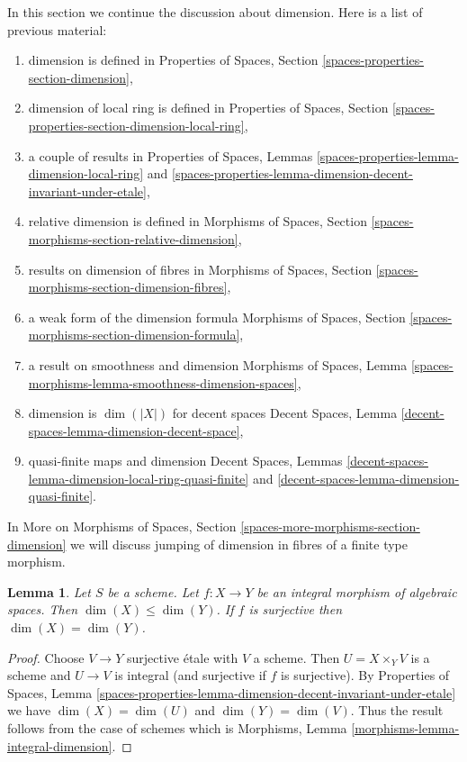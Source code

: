 \documentclass{stacks-project}
\theoremstyle{plain}
\newtheorem{lemma}[subsection]{Lemma}
\theoremstyle{definition}
\theoremstyle{remark}
\numberwithin{equation}{subsection}
\begin{document}
\noindent
In this section we continue the discussion about dimension.
Here is a list of previous material:
\begin{enumerate}
\item dimension is defined in
Properties of Spaces, Section
\ref{spaces-properties-section-dimension},
\item dimension of local ring is defined in
Properties of Spaces, Section
\ref{spaces-properties-section-dimension-local-ring},
\item a couple of results in Properties of Spaces, Lemmas
\ref{spaces-properties-lemma-dimension-local-ring} and
\ref{spaces-properties-lemma-dimension-decent-invariant-under-etale},
\item relative dimension is defined in
Morphisms of Spaces, Section \ref{spaces-morphisms-section-relative-dimension},
\item results on dimension of fibres in
Morphisms of Spaces, Section \ref{spaces-morphisms-section-dimension-fibres},
\item a weak form of the dimension formula
Morphisms of Spaces, Section \ref{spaces-morphisms-section-dimension-formula},
\item a result on smoothness and dimension Morphisms of Spaces, Lemma
\ref{spaces-morphisms-lemma-smoothness-dimension-spaces},
\item dimension is $\dim(|X|)$ for decent spaces
Decent Spaces, Lemma \ref{decent-spaces-lemma-dimension-decent-space},
\item quasi-finite maps and dimension
Decent Spaces, Lemmas
\ref{decent-spaces-lemma-dimension-local-ring-quasi-finite} and
\ref{decent-spaces-lemma-dimension-quasi-finite}.
\end{enumerate}
In More on Morphisms of Spaces, Section
\ref{spaces-more-morphisms-section-dimension}
we will discuss jumping of
dimension in fibres of a finite type morphism.

\begin{lemma}
\label{lemma-integral-dimension}
Let $S$ be a scheme. Let $f : X \to Y$ be an integral morphism
of algebraic spaces. Then $\dim(X) \leq \dim(Y)$.
If $f$ is surjective then $\dim(X) = \dim(Y)$.
\end{lemma}

\begin{proof}
Choose $V \to Y$ surjective \'etale with $V$ a scheme.
Then $U = X \times_Y V$ is a scheme and $U \to V$ is integral
(and surjective if $f$ is surjective).
By Properties of Spaces, Lemma
\ref{spaces-properties-lemma-dimension-decent-invariant-under-etale}
we have $\dim(X) = \dim(U)$ and $\dim(Y) = \dim(V)$.
Thus the result follows from the case of schemes
which is Morphisms, Lemma \ref{morphisms-lemma-integral-dimension}.
\end{proof}
\end{document}
